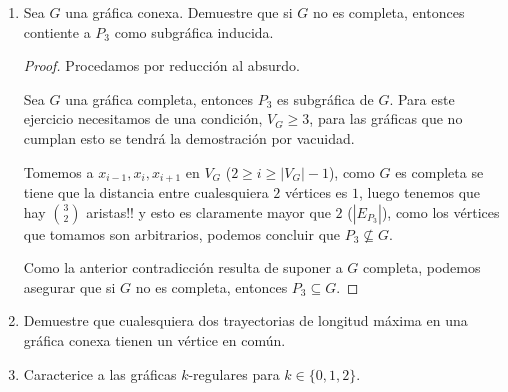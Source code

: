 \documentclass{article}
\begin{document}
\begin{enumerate}
  \begin{proof}
    Sea $P$ una trayectoria de longitud máxima en $G$. \\
    Si $P = (v_{0}, \dots, v_{n})$, notemos que $v_{n}$ tiene un vecino distinto
    a $v_{n-1}$. \\
    Entonces, como $P$ es de longitud máxima, el otro vértice de $v_{n}$ debe ser
    un vértice en $P$ (digamos $v_{i}$ con $i < n-1$). \\
    Entonces $v_{i} P v_{n} v_{i}$ es un ciclo.
  \end{proof}
\item Sea $G$ una gr\'afica conexa.   Demuestre que si $G$ no es completa,
  entonces contiente a $P_3$ como subgr\'afica inducida.
  \renewcommand\qedsymbol{QED}
  \begin{proof}
    Procedamos por reducción al absurdo.

    Sea $G$ una gráfica completa, entonces $P_{3}$ es subgráfica de $G$. Para este
    ejercicio necesitamos de una condición, $V_G \ge 3$, para las gráficas que no
    cumplan esto se tendrá la demostración por vacuidad.

    Tomemos a $x_{i - 1}, x_{i}, x_{i + 1}$ en $V_{G}$ ($2 \ge i \ge
    |V_{G}| - 1$), como $G$ es completa se tiene que la distancia entre cualesquiera
    $2$ v\'ertices es $1$, luego tenemos que hay ${3 \choose 2}$ aristas!! y esto es
    claramente mayor que $2$ ($|E_{P_3}|$), como los v\'ertices que tomamos son arbitrarios,
    podemos concluir que $P_{3} \nsubseteq G$.

    Como la anterior contradicci\'on resulta de suponer a $G$ completa, podemos
    asegurar que si $G$ no es completa, entonces $P_3 \subseteq G$.
  \end{proof}
\item Demuestre que cualesquiera dos trayectorias de longitud m\'axima en una
  gr\'afica conexa tienen un vértice en común.
\item Caracterice a las gr\'aficas $k$-regulares para $k \in \{ 0, 1, 2 \}$.


\end{enumerate}
\end{document}
